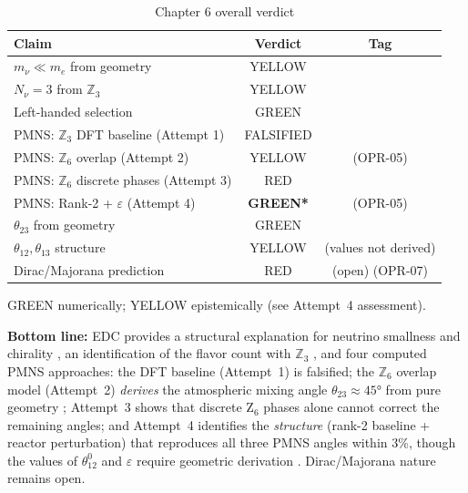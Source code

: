 \begin{table}[ht]
\centering
\caption{Chapter 6 overall verdict}
\label{tab:ch6_verdict}
\begin{tabular}{lcc}
\toprule
\textbf{Claim} & \textbf{Verdict} & \textbf{Tag} \\
\midrule
$m_\nu \ll m_e$ from geometry & YELLOW & \tagDc{} \\
$N_\nu = 3$ from $\mathbb{Z}_3$ & YELLOW & \tagI{} \\
Left-handed selection & GREEN & \tagDc{} \\
PMNS: $\mathbb{Z}_3$ DFT baseline (Attempt 1) & FALSIFIED & \tagDc{} \\
PMNS: $\mathbb{Z}_6$ overlap (Attempt 2) & YELLOW & \tagDc{} (OPR-05) \\
PMNS: $\mathbb{Z}_6$ discrete phases (Attempt 3) & RED & \tagDc{} \\
PMNS: Rank-2 + $\varepsilon$ (Attempt 4) & \textcolor{green!60!black}{\textbf{GREEN*}} & \tagI{} (OPR-05) \\
$\theta_{23}$ from geometry & GREEN & \tagDc{} \\
$\theta_{12}, \theta_{13}$ structure & YELLOW & \tagI{} (values not derived) \\
Dirac/Majorana prediction & RED & (open) (OPR-07) \\
\bottomrule
\end{tabular}

\vspace{0.5em}
{\footnotesize *GREEN numerically; YELLOW epistemically (see Attempt~4 assessment).}
\end{table}

\textbf{Bottom line:} EDC provides a structural explanation for neutrino
smallness and chirality \tagDc{}, an identification of the flavor count with
$\mathbb{Z}_3$ \tagI{}, and four computed PMNS approaches: the DFT baseline (Attempt~1)
is falsified; the $\mathbb{Z}_6$ overlap model (Attempt~2) \emph{derives} the
atmospheric mixing angle $\theta_{23} \approx 45°$ from pure geometry \tagDc{};
Attempt~3 shows that discrete Z$_6$ phases alone cannot correct the remaining angles;
and Attempt~4 identifies the \emph{structure} (rank-2 baseline + reactor perturbation)
that reproduces all three PMNS angles within 3\%, though the values of $\theta_{12}^0$
and $\varepsilon$ require geometric derivation \tagI{}. Dirac/Majorana nature remains open.

